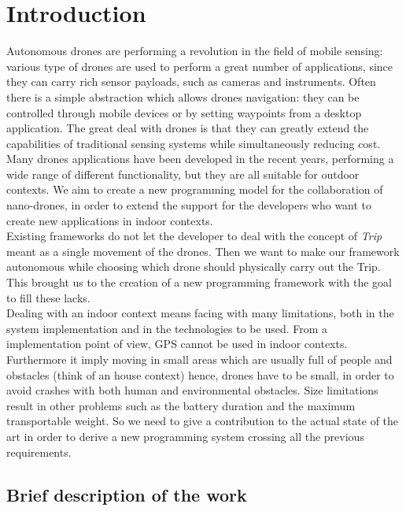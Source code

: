 \chapter{Introduction}
\label{cap1}

Autonomous drones are performing a revolution in the field of mobile sensing: various type of drones are used to perform a great number of applications, since they can carry rich sensor payloads, such as cameras and instruments.
Often there is a simple abstraction which allows drones navigation: they can be controlled through mobile devices or by setting waypoints from a desktop application.
The great deal with drones is that they can greatly extend the capabilities of traditional sensing systems while simultaneously reducing cost.
\\

Many drones applications have been developed in the recent years, performing a wide range of different functionality, but they are all suitable for outdoor contexts.
We aim to create a new programming model for the collaboration of nano-drones, in order to extend the support for the developers who want to create new applications in indoor contexts.
\\

Existing frameworks do not let the developer to deal with the concept of \textit{Trip} meant as a single movement of the drones. Then we want to make our framework autonomous while choosing which drone should physically carry out the Trip.
This brought us to the creation of a new programming framework with the goal to fill these lacks.
\\

Dealing with an indoor context means facing with many limitations, both in the system implementation and in the technologies to be used.
From a implementation point of view, GPS cannot be used in indoor contexts. Furthermore it imply moving in small areas which are usually full of people and obstacles (think of an house context) hence, drones have to be small, in order to avoid crashes with both human and environmental obstacles.
Size limitations result in other problems such as the battery duration and the maximum transportable weight.
So we need to give a contribution to the actual state of the art in order to derive a new programming system crossing all the previous requirements.


\section{Brief description of the work}

